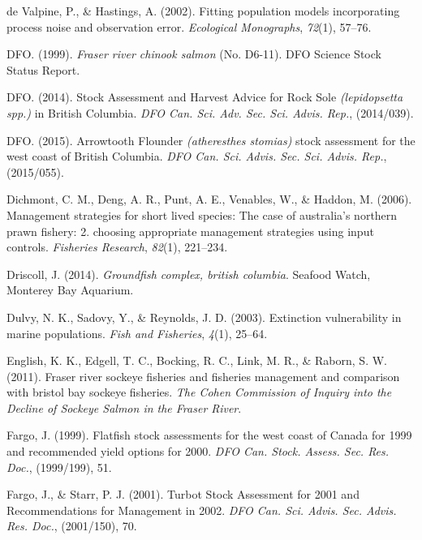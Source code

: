 \documentclass[12pt,]{scrartcl}
\begin{document}
\hypertarget{ref-de2002fitting}{}
de Valpine, P., \& Hastings, A. (2002). Fitting population models
incorporating process noise and observation error. \emph{Ecological
Monographs}, \emph{72}(1), 57--76.

\hypertarget{ref-DFO1999Fraser-River-Ch}{}
DFO. (1999). \emph{Fraser river chinook salmon} (No. D6-11). DFO Science
Stock Status Report.

\hypertarget{ref-dfo2014stock-asse}{}
DFO. (2014). Stock Assessment and Harvest Advice for Rock Sole
\emph{(lepidopsetta spp.)} in British Columbia. \emph{DFO Can. Sci. Adv.
Sec. Sci. Advis. Rep.}, (2014/039).

\hypertarget{ref-dfo2015arrowtooth}{}
DFO. (2015). Arrowtooth Flounder \emph{(atheresthes stomias)} stock
assessment for the west coast of British Columbia. \emph{DFO Can. Sci.
Advis. Sec. Sci. Advis. Rep.}, (2015/055).

\hypertarget{ref-dichmont2006management2}{}
Dichmont, C. M., Deng, A. R., Punt, A. E., Venables, W., \& Haddon, M.
(2006). Management strategies for short lived species: The case of
australia's northern prawn fishery: 2. choosing appropriate management
strategies using input controls. \emph{Fisheries Research},
\emph{82}(1), 221--234.

\hypertarget{ref-Driscoll2014Groundfish-comp}{}
Driscoll, J. (2014). \emph{Groundfish complex, british columbia}.
Seafood Watch, Monterey Bay Aquarium.

\hypertarget{ref-dulvy2003extinction}{}
Dulvy, N. K., Sadovy, Y., \& Reynolds, J. D. (2003). Extinction
vulnerability in marine populations. \emph{Fish and Fisheries},
\emph{4}(1), 25--64.

\hypertarget{ref-english2011fraser}{}
English, K. K., Edgell, T. C., Bocking, R. C., Link, M. R., \& Raborn,
S. W. (2011). Fraser river sockeye fisheries and fisheries management
and comparison with bristol bay sockeye fisheries. \emph{The Cohen
Commission of Inquiry into the Decline of Sockeye Salmon in the Fraser
River}.

\hypertarget{ref-fargo1999flatfish-s}{}
Fargo, J. (1999). Flatfish stock assessments for the west coast of
Canada for 1999 and recommended yield options for 2000. \emph{DFO Can.
Stock. Assess. Sec. Res. Doc.}, (1999/199), 51.

\hypertarget{ref-fargo2001turbot-sto}{}
Fargo, J., \& Starr, P. J. (2001). Turbot Stock Assessment for 2001 and
Recommendations for Management in 2002. \emph{DFO Can. Sci. Advis. Sec.
Advis. Res. Doc.}, (2001/150), 70.
\end{document}
